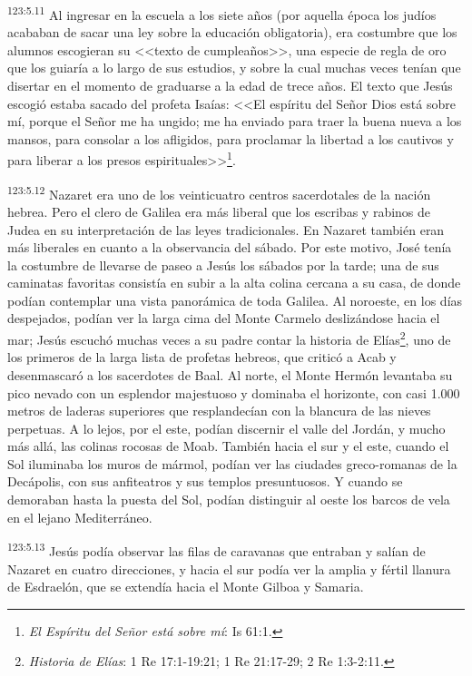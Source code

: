 \par 
\textsuperscript{123:5.11} Al ingresar en la escuela a los siete años (por aquella época los judíos acababan de sacar una ley sobre la educación obligatoria), era costumbre que los alumnos escogieran su <<texto de cumpleaños>>, una especie de regla de oro que los guiaría a lo largo de sus estudios, y sobre la cual muchas veces tenían que disertar en el momento de graduarse a la edad de trece años. El texto que Jesús escogió estaba sacado del profeta Isaías: <<El espíritu del Señor Dios está sobre mí, porque el Señor me ha ungido; me ha enviado para traer la buena nueva a los mansos, para consolar a los afligidos, para proclamar la libertad a los cautivos y para liberar a los presos espirituales>>\footnote{\textit{El Espíritu del Señor está sobre mí}: Is 61:1.}.

\par 
\textsuperscript{123:5.12} Nazaret era uno de los veinticuatro centros sacerdotales de la nación hebrea. Pero el clero de Galilea era más liberal que los escribas y rabinos de Judea en su interpretación de las leyes tradicionales. En Nazaret también eran más liberales en cuanto a la observancia del sábado. Por este motivo, José tenía la costumbre de llevarse de paseo a Jesús los sábados por la tarde; una de sus caminatas favoritas consistía en subir a la alta colina cercana a su casa, de donde podían contemplar una vista panorámica de toda Galilea. Al noroeste, en los días despejados, podían ver la larga cima del Monte Carmelo deslizándose hacia el mar; Jesús escuchó muchas veces a su padre contar la historia de Elías\footnote{\textit{Historia de Elías}: 1 Re 17:1-19:21; 1 Re 21:17-29; 2 Re 1:3-2:11.}, uno de los primeros de la larga lista de profetas hebreos, que criticó a Acab y desenmascaró a los sacerdotes de Baal. Al norte, el Monte Hermón levantaba su pico nevado con un esplendor majestuoso y dominaba el horizonte, con casi 1.000 metros de laderas superiores que resplandecían con la blancura de las nieves perpetuas. A lo lejos, por el este, podían discernir el valle del Jordán, y mucho más allá, las colinas rocosas de Moab. También hacia el sur y el este, cuando el Sol iluminaba los muros de mármol, podían ver las ciudades greco-romanas de la Decápolis, con sus anfiteatros y sus templos presuntuosos. Y cuando se demoraban hasta la puesta del Sol, podían distinguir al oeste los barcos de vela en el lejano Mediterráneo.

\par 
\textsuperscript{123:5.13} Jesús podía observar las filas de caravanas que entraban y salían de Nazaret en cuatro direcciones, y hacia el sur podía ver la amplia y fértil llanura de Esdraelón, que se extendía hacia el Monte Gilboa y Samaria.

